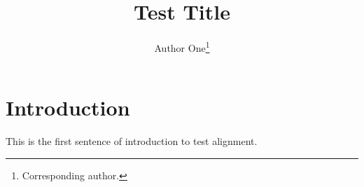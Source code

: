 \documentclass[runningheads]{llncs}
\begin{document}
\title{Test Title}
\author{Author One\thanks{Corresponding author.}}
\maketitle
\section{Introduction}
This is the first sentence of introduction to test alignment.
\end{document}
